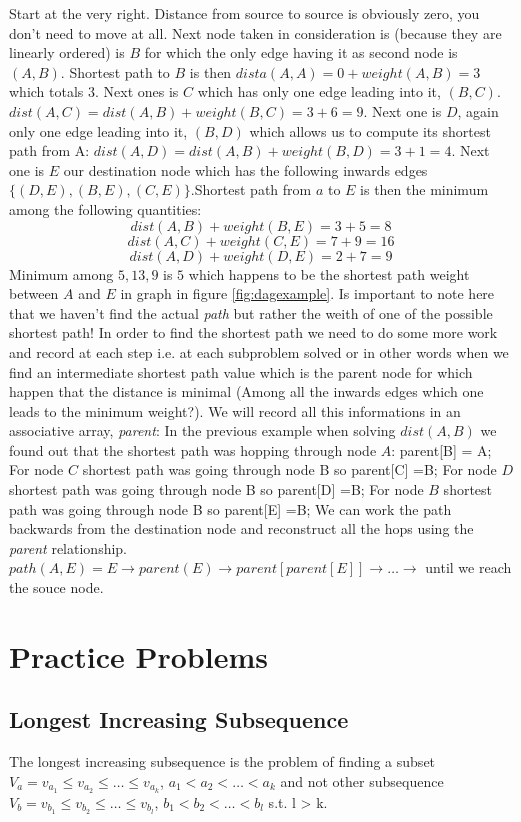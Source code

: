 Start at the very right. Distance from source to source is obviously zero, you don't need to move at all. 
Next node taken in consideration is (because they are linearly ordered) is $B$ for which the only edge having it as second node is $(A,B)$. Shortest path to 
$B$ is then $dista(A,A)=0 + weight(A,B) =3$ which totals $3$. Next ones is $C$ which has only one edge leading into it, $(B,C)$. $dist(A,C) = dist(A,B) + weight(B,C) = 3+6=9$.
Next one is $D$, again only one edge leading into it, $(B,D)$ which allows us to compute its shortest path from A: $dist(A,D) = dist(A,B) + weight(B,D) = 3 +1 =4$.
Next one is $E$ our destination node which has the following inwards edges $\{(D,E),(B,E), (C,E)\}$.Shortest path from $a$ to $E$ is then 
the minimum among the following quantities:
\[
	dist(A,B) + weight(B,E) = 3+5=8
\]
\[
	dist(A,C) + weight(C,E) = 7 + 9 = 16
\]
\[
	dist(A,D) + weight(D,E) = 2 +7 =9
\]
Minimum among $5,13,9$ is $5$ which happens to be the shortest path weight between $A$ and $E$ in graph in figure \ref{fig:dagexample}.
Is important to note here that we haven't find the actual \textit{path} but rather the weith of one of the possible shortest path! In order to find the shortest path we need to do some more work and record at each step i.e. at each subproblem solved or in other words when we find an intermediate shortest path value which is the parent node for which happen that the distance is minimal (Among all the inwards edges which one leads to the minimum weight?).
We will record all this informations in an associative array, \textit{parent}:
In the previous example when solving $dist(A,B)$ we found out that the shortest path was hopping through node $A$:  parent[B] = A;
For node $C$ shortest path was going through node B so parent[C] =B;
For node $D$ shortest path was going through node B so parent[D] =B;
For node $B$ shortest path was going through node B so parent[E] =B;
We can work the path backwards from the destination node and reconstruct all the hops using the \textit{parent} relationship.
$path(A,E) = E \rightarrow parent(E) \rightarrow  parent[parent[E]] \rightarrow  \ldots \rightarrow $ until we reach the souce node.
\section{Practice Problems}

\subsection{Longest Increasing Subsequence}
The longest increasing subsequence is the problem of finding a subset $V_a=v_{a_1} \leq v_{a_2} \leq\ldots \leq v_{a_k}$, $a_1 < a_2 < \ldots < a_k$ and not other subsequence $V_b=v_{b_1}\leq v_{b_2}\leq \ldots \leq v_{b_l}$, $b_1 < b_2 < \ldots < b_l$ s.t. l > k.

